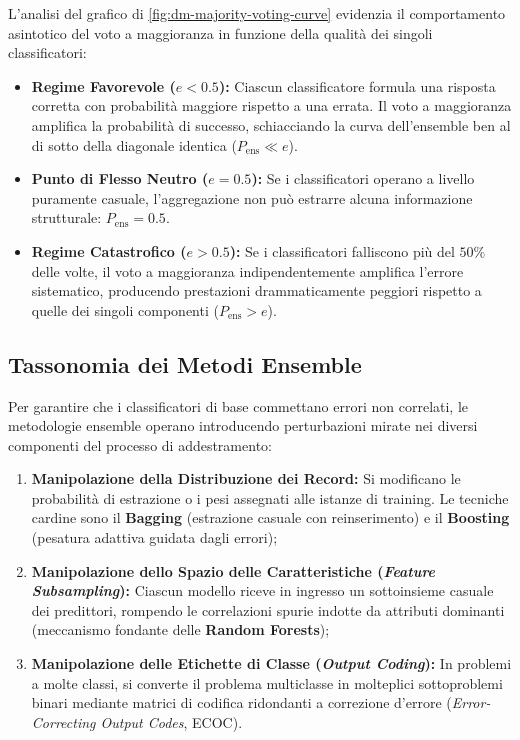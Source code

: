 L'analisi del grafico di \autoref{fig:dm-majority-voting-curve} evidenzia il comportamento asintotico del voto a maggioranza in funzione della qualità dei singoli classificatori:
\begin{itemize}
    \item \textbf{Regime Favorevole ($e < 0.5$):} Ciascun classificatore formula una risposta corretta con probabilità maggiore rispetto a una errata. Il voto a maggioranza amplifica la probabilità di successo, schiacciando la curva dell'ensemble ben al di sotto della diagonale identica ($P_{\text{ens}} \ll e$).
    \item \textbf{Punto di Flesso Neutro ($e = 0.5$):} Se i classificatori operano a livello puramente casuale, l'aggregazione non può estrarre alcuna informazione strutturale: $P_{\text{ens}} = 0.5$.
    \item \textbf{Regime Catastrofico ($e > 0.5$):} Se i classificatori falliscono più del $50\%$ delle volte, il voto a maggioranza indipendentemente amplifica l'errore sistematico, producendo prestazioni drammaticamente peggiori rispetto a quelle dei singoli componenti ($P_{\text{ens}} > e$).
\end{itemize}

\FloatBarrier
\subsection{Tassonomia dei Metodi Ensemble}
\label{subsec:dm-ensemble-taxonomy}

Per garantire che i classificatori di base commettano errori non correlati, le metodologie ensemble operano introducendo perturbazioni mirate nei diversi componenti del processo di addestramento:
\begin{enumerate}
    \item \textbf{Manipolazione della Distribuzione dei Record:} Si modificano le probabilità di estrazione o i pesi assegnati alle istanze di training. Le tecniche cardine sono il \textbf{Bagging} (estrazione casuale con reinserimento) e il \textbf{Boosting} (pesatura adattiva guidata dagli errori);
    \item \textbf{Manipolazione dello Spazio delle Caratteristiche (\textit{Feature Subsampling}):} Ciascun modello riceve in ingresso un sottoinsieme casuale dei predittori, rompendo le correlazioni spurie indotte da attributi dominanti (meccanismo fondante delle \textbf{Random Forests});
    \item \textbf{Manipolazione delle Etichette di Classe (\textit{Output Coding}):} In problemi a molte classi, si converte il problema multiclasse in molteplici sottoproblemi binari mediante matrici di codifica ridondanti a correzione d'errore (\textit{Error-Correcting Output Codes}, ECOC).
\end{enumerate}

